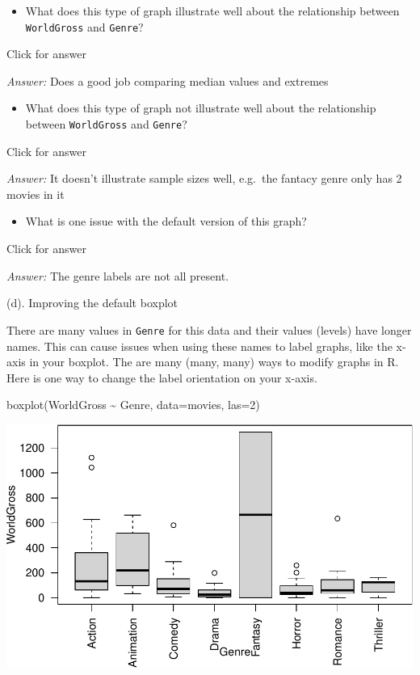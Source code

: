 \documentclass[
]{book}
\newenvironment{Shaded}{\begin{snugshade}}{\end{snugshade}}
\newcommand{\AttributeTok}[1]{\textcolor[rgb]{0.77,0.63,0.00}{#1}}
\newcommand{\DecValTok}[1]{\textcolor[rgb]{0.00,0.00,0.81}{#1}}
\newcommand{\FunctionTok}[1]{\textcolor[rgb]{0.00,0.00,0.00}{#1}}
\newcommand{\NormalTok}[1]{#1}
\newcommand{\SpecialCharTok}[1]{\textcolor[rgb]{0.00,0.00,0.00}{#1}}
\providecommand{\tightlist}{%
  \setlength{\itemsep}{0pt}\setlength{\parskip}{0pt}}
\begin{document}
\begin{itemize}
\tightlist
\item
  What does this type of graph illustrate well about the relationship between \texttt{WorldGross} and \texttt{Genre}?
\end{itemize}

Click for answer

\emph{Answer:} Does a good job comparing median values and extremes

\begin{itemize}
\tightlist
\item
  What does this type of graph not illustrate well about the relationship between \texttt{WorldGross} and \texttt{Genre}?
\end{itemize}

Click for answer

\emph{Answer:} It doesn't illustrate sample sizes well, e.g.~the fantacy genre only has 2 movies in it

\begin{itemize}
\tightlist
\item
  What is one issue with the default version of this graph?
\end{itemize}

Click for answer

\emph{Answer:} The genre labels are not all present.

(d). Improving the default boxplot

There are many values in \texttt{Genre} for this data and their values (levels) have longer names. This can cause issues when using these names to label graphs, like the x-axis in your boxplot. The are many (many, many) ways to modify graphs in R. Here is one way to change the label orientation on your x-axis.

\begin{Shaded}
\begin{Highlighting}[]
\FunctionTok{boxplot}\NormalTok{(WorldGross }\SpecialCharTok{\textasciitilde{}}\NormalTok{ Genre, }\AttributeTok{data=}\NormalTok{movies, }\AttributeTok{las=}\DecValTok{2}\NormalTok{)}
\end{Highlighting}
\end{Shaded}

\includegraphics[width=1\linewidth]{Class_Activity_5_files/figure-latex/unnamed-chunk-30-1}
\end{document}
